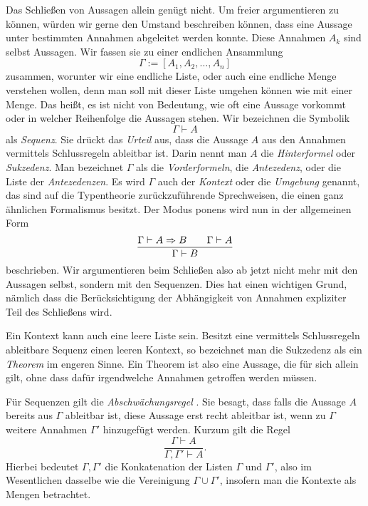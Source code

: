 Das Schließen von Aussagen allein genügt nicht. Um freier argumentieren
zu können, würden wir gerne den Umstand beschreiben können, dass eine
Aussage unter bestimmten Annahmen abgeleitet werden konnte. Diese
Annahmen $A_k$ sind selbst Aussagen. Wir fassen sie zu einer endlichen
Ansammlung
\[\Gamma := [A_1,A_2,\ldots,A_n]\]
zusammen, worunter wir eine endliche Liste, oder auch eine endliche
Menge verstehen wollen, denn man soll mit dieser Liste umgehen können
wie mit einer Menge. Das heißt, es ist nicht von Bedeutung, wie
oft eine Aussage vorkommt oder in welcher Reihenfolge die Aussagen
stehen. Wir bezeichnen die Symbolik
\[\Gamma\vdash A\]
als \emph{Sequenz}. Sie drückt das \emph{Urteil}%
 aus, dass die Aussage $A$ aus den Annahmen
vermittels Schlussregeln ableitbar ist. Darin nennt man $A$ die
\emph{Hinterformel} oder \emph{Sukzedenz}. Man bezeichnet $\Gamma$ als
die \emph{Vorderformeln}, die \emph{Antezedenz},
 oder die Liste der \emph{Antezedenzen}. Es wird
$\Gamma$ auch der \emph{Kontext}
oder die \emph{Umgebung} genannt, das sind auf die
Typentheorie zurückzuführende Sprechweisen, die einen ganz ähnlichen
Formalismus besitzt.
Der Modus ponens wird nun in der allgemeinen Form
\[\dfrac{\Gamma\vdash A\Rightarrow B\qquad\Gamma\vdash A}{\Gamma\vdash B}\]
beschrieben. Wir argumentieren beim Schließen also ab jetzt nicht mehr
mit den Aussagen selbst, sondern mit den Sequenzen. Dies hat einen wichtigen
Grund, nämlich dass die Berücksichtigung der Abhängigkeit von Annahmen
expliziter Teil des Schließens wird.

Ein Kontext kann auch eine leere Liste sein. Besitzt eine vermittels
Schlussregeln ableitbare Sequenz einen leeren Kontext, so bezeichnet
man die Sukzedenz als ein \emph{Theorem} im engeren
Sinne. Ein Theorem ist also eine Aussage, die für sich allein gilt,
ohne dass dafür irgendwelche Annahmen getroffen werden müssen.

Für Sequenzen gilt die \emph{Abschwächungsregel}%
. Sie besagt, dass
falls die Aussage $A$ bereits aus $\Gamma$ ableitbar ist, diese
Aussage erst recht ableitbar ist, wenn zu $\Gamma$ weitere Annahmen
$\Gamma'$ hinzugefügt werden. Kurzum gilt die Regel
\[\dfrac{\Gamma\vdash A}{\Gamma,\Gamma'\vdash A}.\]
Hierbei bedeutet $\Gamma,\Gamma'$ die Konkatenation der Listen
$\Gamma$ und $\Gamma'$, also im Wesentlichen dasselbe wie die
Vereinigung $\Gamma\cup\Gamma'$, insofern man die Kontexte als
Mengen betrachtet.

